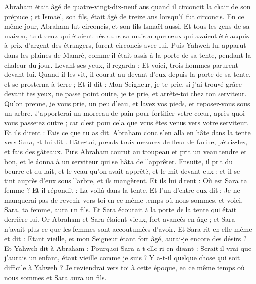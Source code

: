 \begin{multicols}{2}
Abraham était âgé de quatre-vingt-dix-neuf ans quand il circoncit la chair de son prépuce ;
et Ismaël, son fils, était âgé de treize ans lorsqu'il fut circoncis.
En ce même jour, Abraham fut circoncis, et son fils Ismaël aussi.
Et tous les gens de sa maison, tant ceux qui étaient nés dans sa maison que ceux qui avaient été acquis à prix d’argent des étrangers, furent circoncis avec lui.
\VerseOne{}Puis Yahweh lui apparut dans les plaines de Mamré, comme il était assis à la porte de sa tente, pendant la chaleur du jour.
Levant ses yeux, il regarda : Et voici, trois hommes parurent devant lui. Quand il les vit, il courut au-devant d'eux depuis la porte de sa tente, et se prosterna à terre ;
Et il dit : Mon Seigneur, je te prie, si j'ai trouvé grâce devant tes yeux, ne passe point outre, je te prie, et arrête-toi chez ton serviteur.
Qu'on prenne, je vous prie, un peu d'eau, et lavez vos pieds, et reposez-vous sous un arbre.
J’apporterai un morceau de pain pour fortifier votre cœur, après quoi vous passerez outre ; car c'est pour cela que vous êtes venus vers votre serviteur. Et ils dirent : Fais ce que tu as dit.
Abraham donc s'en alla en hâte dans la tente vers Sara, et lui dit : Hâte-toi, prends trois mesures de fleur de farine, pétris-les, et fais des gâteaux.
Puis Abraham courut au troupeau et prit un veau tendre et bon, et le donna à un serviteur qui se hâta de l'apprêter.
Ensuite, il prit du beurre et du lait, et le veau qu'on avait apprêté, et le mit devant eux ; et il se tint auprès d'eux sous l'arbre, et ils mangèrent.
Et ils lui dirent : Où est Sara ta femme ? Et il répondit : La voilà dans la tente.
Et l'un d'entre eux dit : Je ne manquerai pas de revenir vers toi en ce même temps où nous sommes, et voici, Sara, ta femme, aura un fils. Et Sara écoutait à la porte de la tente qui était derrière lui.
Or Abraham et Sara étaient vieux, fort avancés en âge ; et Sara n'avait plus ce que les femmes sont accoutumées d'avoir.
Et Sara rit en elle-même et dit : Etant vieille, et mon Seigneur étant fort âgé, aurai-je encore des désirs ?
Et Yahweh dit à Abraham : Pourquoi Sara a-t-elle ri en disant : Serait-il vrai que j'aurais un enfant, étant vieille comme je suis ?
Y a-t-il quelque chose qui soit difficile à Yahweh ? Je reviendrai vers toi à cette époque, en ce même temps où nous sommes et Sara aura un fils.

\end{multicols}
